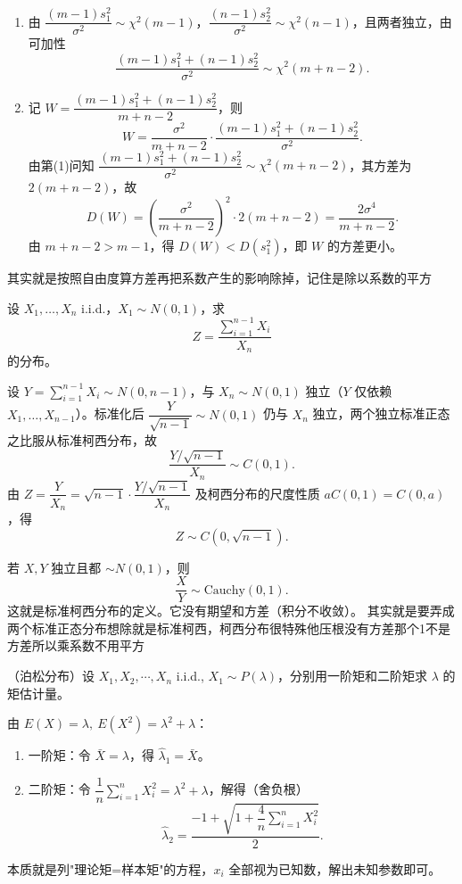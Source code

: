 \begin{solution}
\begin{enumerate}
\item 由 \(\dfrac{(m-1)s_1^2}{\sigma^2}\sim\chi^2(m-1)\)，\(\dfrac{(n-1)s_2^2}{\sigma^2}\sim\chi^2(n-1)\)，且两者独立，由可加性
\[
\frac{(m-1)s_1^2+(n-1)s_2^2}{\sigma^2}\sim\chi^2(m+n-2).
\]

\item 记 $W=\dfrac{(m-1)s_1^2+(n-1)s_2^2}{m+n-2}$，则
\[
W = \frac{\sigma^2}{m+n-2}\cdot\frac{(m-1)s_1^2+(n-1)s_2^2}{\sigma^2}.
\]
由第(1)问知 $\dfrac{(m-1)s_1^2+(n-1)s_2^2}{\sigma^2}\sim\chi^2(m+n-2)$，其方差为 $2(m+n-2)$，故
\[
D(W)=\left(\frac{\sigma^2}{m+n-2}\right)^2\cdot 2(m+n-2)=\frac{2\sigma^4}{m+n-2}.
\]
由 \(m+n-2>m-1\)，得 \(D(W)<D(s_1^2)\)，即 \(W\) 的方差更小。
\end{enumerate}
\end{solution}
\begin{dxtips}
    其实就是按照自由度算方差再把系数产生的影响除掉，记住是除以系数的平方
\end{dxtips}
\begin{homework}[2.4第3题]
设 \(X_1,\ldots,X_n\) i.i.d.，\(X_1\sim N(0,1)\)，求
\[
Z=\frac{\sum_{i=1}^{n-1}X_i}{X_n}
\]
的分布。
\end{homework}
\begin{solution}
设 \(Y=\sum_{i=1}^{n-1}X_i\sim N(0,n-1)\)，与 \(X_n\sim N(0,1)\) 独立（\(Y\) 仅依赖 \(X_1,\ldots,X_{n-1}\)）。标准化后 \(\dfrac{Y}{\sqrt{n-1}}\sim N(0,1)\) 仍与 \(X_n\) 独立，两个独立标准正态之比服从标准柯西分布，故
\[
\frac{Y/\sqrt{n-1}}{X_n}\sim C(0,1).
\]
由 \(Z=\dfrac{Y}{X_n}=\sqrt{n-1}\cdot\dfrac{Y/\sqrt{n-1}}{X_n}\) 及柯西分布的尺度性质 \(aC(0,1)=C(0,a)\)，得
\[
Z\sim C(0,\sqrt{n-1}).
\]
\end{solution}
\begin{dxtips}
   若 $X, Y$ 独立且都 $\sim N(0,1)$，则
\[
\frac{X}{Y} \sim \text{Cauchy}(0,1).
\]
这就是标准柯西分布的定义。它没有期望和方差（积分不收敛）。
   其实就是要弄成两个标准正态分布想除就是标准柯西，柯西分布很特殊他压根没有方差那个1不是方差所以乘系数不用平方 
\end{dxtips}
\begin{homework}[1]
（泊松分布）设 \(X_1,X_2,\cdots,X_n\) i.i.d., \(X_1\sim P(\lambda)\)，分别用一阶矩和二阶矩求 \(\lambda\) 的矩估计量。
\end{homework}
\begin{solution}
由 $E(X)=\lambda,\ E(X^2)=\lambda^2+\lambda$：

\begin{enumerate}
    \item 一阶矩：令 $\bar X=\lambda$，得 $\hat\lambda_1=\bar X$。
    \item 二阶矩：令 $\dfrac1n\displaystyle\sum_{i=1}^n X_i^2=\lambda^2+\lambda$，解得（舍负根）
    \[
    \hat\lambda_2=\frac{-1+\sqrt{1+\dfrac{4}{n}\sum_{i=1}^n X_i^2}}{2}.
    \]
\end{enumerate}
\end{solution}
\begin{dxtips}
本质就是列"理论矩=样本矩"的方程，$x_i$ 全部视为已知数，解出未知参数即可。
\end{dxtips}

